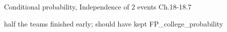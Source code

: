 \documentclass[handout]{mcs}
\begin{document}
\begin{staffnotes}
Conditional probability, Independence of 2 events Ch.18-18.7
\end{staffnotes}


\begin{staffnotes}
half the teams finished early; should have kept FP_college_probability
\end{staffnotes}






\iffalse
\begin{center}
\textbf{\large Supplemental problems}
\end{center}
\fi




\end{document}
